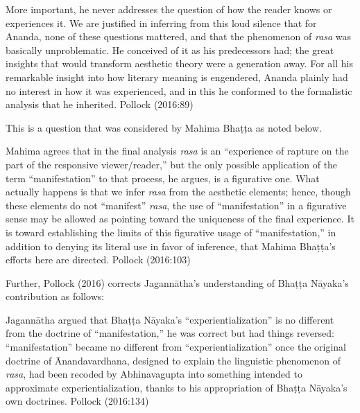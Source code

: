 \begin{myquote}
More important, he never addresses the question of how the reader knows or experiences it. We are justified in inferring from this loud silence that for Ananda, none of these questions mattered, and that the phenomenon of \textsl{rasa} was basically unproblematic. He conceived of it as his predecessors had; the great insights that would transform aesthetic theory were a generation away. For all his remarkable insight into how literary meaning is engendered, Ananda plainly had no interest in how it was experienced, and in this he conformed to the formalistic analysis that he inherited.
\hfill Pollock (2016:89)
\end{myquote}

This is a question that was considered by Mahima Bhaṭṭa as noted below.

\begin{myquote}
Mahima agrees that in the final analysis \textsl{rasa} is an “experience of rapture on the part of the responsive viewer/reader,” but the only possible application of the term “manifestation” to that process, he argues, is a figurative one. What actually happens is that we infer \textsl{rasa} from the aesthetic elements; hence, though these elements do not “manifest” \textsl{rasa}, the use of “manifestation” in a figurative sense may be allowed as pointing toward the uniqueness of the final experience. It is toward establishing the limits of this figurative usage of “manifestation,” in addition to denying its literal use in favor of inference, that Mahima Bhaṭṭa’s efforts here are directed.
\hfill Pollock (2016:103)
\end{myquote}

Further, Pollock (2016) corrects Jagannātha’s understanding of Bhaṭṭa Nāyaka’s contribution as follows:

\begin{myquote}
Jagannātha argued that Bhaṭṭa Nāyaka’s “experientialization” is no different from the doctrine of “manifestation,” he was correct but had things reversed: “manifestation” became no different from “experientialization” once the original doctrine of Ānandavardhana, designed to explain the linguistic phenomenon of \textsl{rasa}, had been recoded by Abhinavagupta into something intended to approximate experientialization, thanks to his appropriation of Bhaṭṭa Nāyaka’s own doctrines.
\hfill Pollock (2016:134)
\end{myquote}

